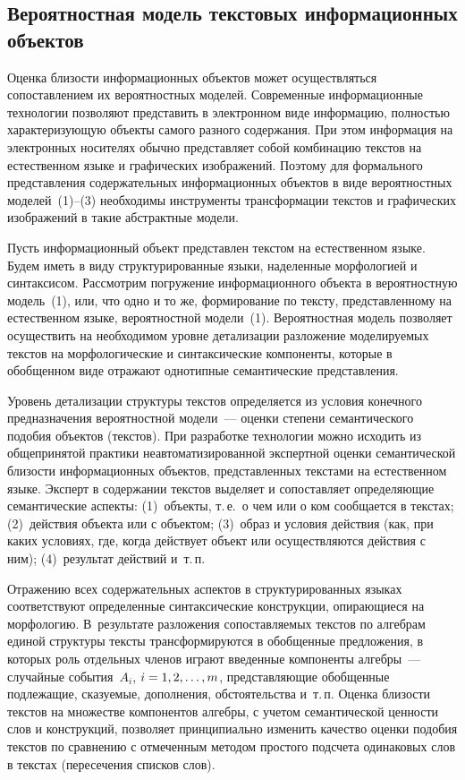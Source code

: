 \begin{multicols}{2}
\section{Вероятностная модель текстовых информационных
объектов}

  Оценка близости информационных объектов может осуществляться
сопоставлением их вероятностных моделей. Современные информационные
технологии позволяют представить в электронном виде информацию,
полностью характеризующую объекты самого разного содержания. При этом
информация на электронных носителях обычно представляет собой
комбинацию текстов на естественном языке и графических изображений.
Поэтому для формального представления содержательных информационных
объектов в виде вероятностных моделей~(1)--(3) необходимы инструменты
трансформации текстов и графических изображений в такие абстрактные
модели.

  Пусть информационный объект представлен текстом на естественном языке.
Будем иметь в виду структурированные языки, наделенные морфологией и
синтаксисом. Рассмотрим погружение информационного объекта в
вероятностную модель~(1), или, что одно и то же, формирование по тексту,
представленному на естественном языке, вероятностной модели~(1).
Вероятностная модель позволяет осуществить на необходимом уровне
детализации разложение моделируемых текстов на морфологические и
синтаксические компоненты, которые в обобщенном виде отражают
однотипные семантические представления.

  Уровень детализации структуры текстов определяется из условия конечного
предназначения вероят\-ностной модели~--- оценки степени семантического
подобия объектов (текстов). При разработке технологии можно исходить из
общепринятой практики неавтоматизированной экспертной оценки
семантической близости информационных объектов, представленных текстами
на естественном языке. Эксперт в содержании текстов выделяет и сопоставляет
определяющие семантические аспекты: (1)~объекты, т.\,е.\ о чем или о ком
сообщается в текстах; (2)~действия объекта или с объектом; (3)~образ и условия
действия (как, при каких условиях, где, когда действует объект или
осуществляются действия с ним); (4)~результат действий и~т.\,п.

  Отражению всех содержательных аспектов в структурированных языках
соответствуют определенные синтаксические конструкции, опирающиеся на
морфологию. В~результате разложения сопоставляемых текстов по алгебрам
единой структуры тексты трансформируются в обобщенные предложения, в
которых роль отдельных членов играют введенные компоненты алгебры~---
случайные события~$A_i$, $i\hm=1, 2, \ldots , m$, представляющие обобщенные
подлежащие, сказуемые, дополнения, обстоятельства и~т.\,п. Оценка близости
текстов на множестве компонентов алгебры, с учетом семантической ценности
слов и конструкций, позволяет принципиально изменить качество оценки
подобия текстов по сравнению с отмеченным методом простого подсчета
одинаковых слов в текстах (пересечения списков слов).


\end{multicols}
